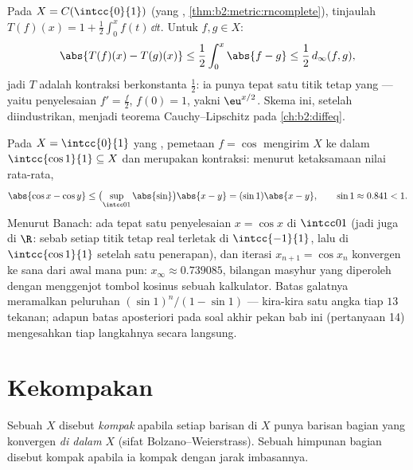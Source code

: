 \begin{example}\label{ex:b2:metric:integralequation}
Pada $X = C(\intcc{0}{1})$ (yang ,
\cref{thm:b2:metric:rncomplete}), tinjaulah $T(f)(x) = 1 + \frac12
\int_0^x f(t)\,\dd t$. Untuk $f, g \in X$:
\[
\abs{T(f)(x) - T(g)(x)} \leq \frac12 \int_0^x \abs{f - g} \leq
\frac12\, d_\infty(f, g),
\]
jadi $T$ adalah kontraksi berkonstanta $\frac12$: ia punya tepat satu
titik tetap yang  --- yaitu penyelesaian $f' = \frac f2$, $f(0) =
1$, yakni $\eu^{x/2}$. Skema ini, setelah diindustrikan, menjadi
teorema Cauchy--Lipschitz pada \cref{ch:b2:diffeq}.
\end{example}

\begin{example}[Sebuah titik tetap numerik: $x = \cos x$]\label{ex:b2:metric:cosfix}
Pada $X = \intcc{0}{1}$ yang , pemetaan $f = \cos$ mengirim $X$
ke dalam $\intcc{\cos 1}{1} \subseteq X$ dan merupakan kontraksi: menurut
ketaksamaan nilai rata-rata,
\[
\abs{\cos x - \cos y} \leq \bigl(\sup_{\intcc01}\abs{\sin}\bigr)
\abs{x - y} = (\sin 1)\abs{x - y},
\qquad \sin 1 \approx 0.841 < 1 .
\]
Menurut Banach: ada tepat satu penyelesaian $x = \cos x$ di $\intcc01$
(jadi juga di $\R$: sebab setiap titik tetap real terletak di
$\intcc{-1}{1}$, lalu di $\intcc{\cos 1}{1}$ setelah satu penerapan), dan
iterasi $x_{n+1} = \cos x_n$ konvergen ke sana dari awal mana pun:
$x_\infty \approx 0.739085$, bilangan masyhur yang diperoleh dengan
menggenjot tombol kosinus sebuah kalkulator. Batas galatnya meramalkan
peluruhan $(\sin1)^n/(1 - \sin1)$ --- kira-kira satu angka tiap $13$
tekanan; adapun batas aposteriori pada soal akhir pekan bab
ini (pertanyaan 14) mengesahkan tiap langkahnya secara langsung.
\end{example}

\section{Kekompakan}

\begin{definition}\label{def:b2:metric:compact}
Sebuah  $X$ disebut \emph{kompak}
apabila setiap barisan di $X$ punya barisan bagian yang konvergen
\emph{di dalam} $X$ (sifat Bolzano--Weierstrass). Sebuah himpunan bagian
disebut kompak apabila ia kompak dengan jarak imbasannya.
\end{definition}

